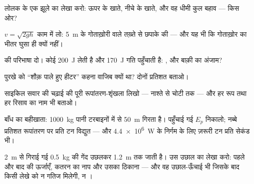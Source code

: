 \begin{exercise}[$\star$]\label{exo:g9:energy-conversions:4}
लोलक के एक झूले का लेखा करो: ऊपर के खाते, नीचे के खाते, और वह धीमी
कुल बहाव --- किस ओर?
\end{exercise}

\begin{exercise}[$\star$]\label{exo:g9:energy-conversions:5}
$v = \sqrt{2 g h}$ काम में लो: \qty{5}{m} के गोताख़ोरी वाले तख़्ते से
छपाके की  --- और यह भी कि गोताख़ोर का  भीतर घुसा ही क्यों
नहीं।
\end{exercise}

\begin{exercise}[$\star$]\label{exo:g9:energy-conversions:6}
 की परिभाषा दो। कोई  \qty{200}{J} लेती है और \qty{170}{J}
गति पहुँचाती है: , और बाक़ी का अंजाम?
\end{exercise}

\begin{exercise}[$\star$]\label{exo:g9:energy-conversions:7}
पुरखे  को ``शौक़ पाले हुए हीटर'' कहना वाजिब क्यों था? दोनों
प्रतिशत बताओ।
\end{exercise}

\begin{exercise}[$\star$]\label{exo:g9:energy-conversions:8}
साइकिल सवार की चढ़ाई की पूरी रूपांतरण-शृंखला लिखो --- नाश्ते से चोटी
तक --- और हर रूप तथा हर रिसाव का नाम भी बताओ।
\end{exercise}

\begin{exercise}[$\star\star$]\label{exo:g9:energy-conversions:9}
बाँध का बहीखाता: \qty{1000}{kg} पानी टरबाइनों में से \qty{50}{m}
गिरता है। पहुँचाई गई $E_p$ निकालो; नब्बे प्रतिशत रूपांतरण पर प्रति टन
विद्युत  --- और \qty{4.4e6}{W} के निर्गम के लिए ज़रूरी टन प्रति
सेकंड भी।
\end{exercise}

\begin{exercise}[$\star\star$]\label{exo:g9:energy-conversions:10}
\qty{2}{m} से गिराई गई \qty{0.5}{kg} की गेंद उछलकर \qty{1.2}{m} तक
जाती है। उस उछाल का लेखा करो: पहले और बाद की ऊर्जाएँ, कतरन का नाप और
उसका ठिकाना --- और वह उछाल-ऊँचाई भी जिसके बाद किसी लेखे को न गतिज
मिलेगी, न ।
\end{exercise}

